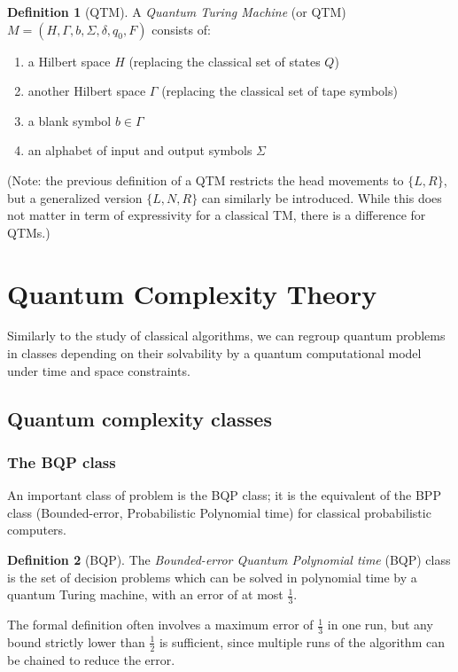 \documentclass[12pt,a4paper]{article}
\theoremstyle{plain}
\theoremstyle{definition}
\newtheorem*{definition}{Definition}
\begin{document}
\begin{definition}[QTM] A \emph{Quantum Turing Machine} (or QTM) $M = (H, \Gamma, b, \Sigma, \delta, q_0, F)$ consists of:
\begin{enumerate}[label=--, noitemsep]
    \item a Hilbert space $H$ (replacing the classical set of states $Q$)
    \item another Hilbert space $\Gamma$ (replacing the classical set of tape symbols)
    \item a blank symbol $b\in \Gamma$
    \item an alphabet of input and output symbols $\Sigma$
\end{enumerate}
    
(Note: the previous definition of a QTM restricts the head movements to $\{L, R\}$, but a generalized version $\{L, N, R\}$ can similarly be introduced. While this does not matter in term of expressivity for a classical TM, there is a difference for QTMs.)

\end{definition}

\section{Quantum Complexity Theory}
Similarly to the study of classical algorithms, we can regroup quantum problems in classes depending on their solvability by a quantum computational model under time and space constraints. 

\subsection{Quantum complexity classes}
\subsubsection{The BQP class}
An important class of problem is the BQP class; it is the equivalent of the BPP class (Bounded-error, Probabilistic Polynomial time) for classical probabilistic computers.

\begin{definition}[BQP] 
    The \emph{Bounded-error Quantum Polynomial time} (BQP) class is the set of decision problems which can be solved in polynomial time by a quantum Turing machine, with an error of at most $\frac{1}{3}$. 
\end{definition}
The formal definition often involves a maximum error of $\frac{1}{3}$ in one run, but any bound strictly lower than $\frac{1}{2}$ is sufficient, since multiple runs of the algorithm can be chained to reduce the error.
\end{document}
